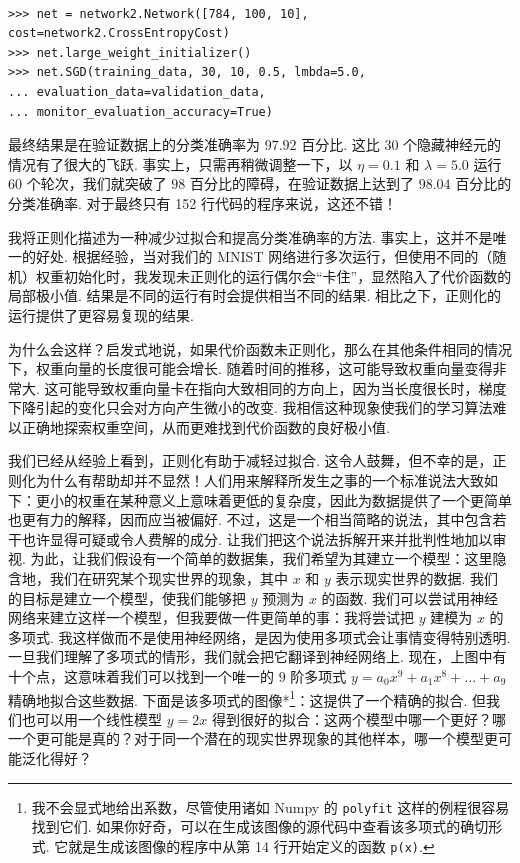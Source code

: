 \begin{lstlisting}

>>> net = network2.Network([784, 100, 10], cost=network2.CrossEntropyCost)
>>> net.large_weight_initializer()
>>> net.SGD(training_data, 30, 10, 0.5, lmbda=5.0,
... evaluation_data=validation_data,
... monitor_evaluation_accuracy=True)

\end{lstlisting}

最终结果是在验证数据上的分类准确率为 $97.92$ 百分比. 这比 30 个隐藏神经元的情况有了很大的飞跃. 事实上，只需再稍微调整一下，以 $\eta = 0.1$ 和 $\lambda = 5.0$ 运行 60 个轮次，我们就突破了 $98$ 百分比的障碍，在验证数据上达到了 $98.04$ 百分比的分类准确率. 对于最终只有 152 行代码的程序来说，这还不错！

我将正则化描述为一种减少过拟合和提高分类准确率的方法. 事实上，这并不是唯一的好处. 根据经验，当对我们的 MNIST 网络进行多次运行，但使用不同的（随机）权重初始化时，我发现未正则化的运行偶尔会``卡住''，显然陷入了代价函数的局部极小值. 结果是不同的运行有时会提供相当不同的结果. 相比之下，正则化的运行提供了更容易复现的结果.

为什么会这样？启发式地说，如果代价函数未正则化，那么在其他条件相同的情况下，权重向量的长度很可能会增长. 随着时间的推移，这可能导致权重向量变得非常大. 这可能导致权重向量卡在指向大致相同的方向上，因为当长度很长时，梯度下降引起的变化只会对方向产生微小的改变. 我相信这种现象使我们的学习算法难以正确地探索权重空间，从而更难找到代价函数的良好极小值.

我们已经从经验上看到，正则化有助于减轻过拟合. 这令人鼓舞，但不幸的是，正则化为什么有帮助却并不显然！人们用来解释所发生之事的一个标准说法大致如下：更小的权重在某种意义上意味着更低的复杂度，因此为数据提供了一个更简单也更有力的解释，因而应当被偏好. 不过，这是一个相当简略的说法，其中包含若干也许显得可疑或令人费解的成分. 让我们把这个说法拆解开来并批判性地加以审视. 为此，让我们假设有一个简单的数据集，我们希望为其建立一个模型：这里隐含地，我们在研究某个现实世界的现象，其中 $x$ 和 $y$ 表示现实世界的数据. 我们的目标是建立一个模型，使我们能够把 $y$ 预测为 $x$ 的函数. 我们可以尝试用神经网络来建立这样一个模型，但我要做一件更简单的事：我将尝试把 $y$ 建模为 $x$ 的多项式. 我这样做而不是使用神经网络，是因为使用多项式会让事情变得特别透明. 一旦我们理解了多项式的情形，我们就会把它翻译到神经网络上. 现在，上图中有十个点，这意味着我们可以找到一个唯一的 $9$ 阶多项式 $y = a_0 x^9 + a_1 x^8 + \ldots + a_9$ 精确地拟合这些数据. 下面是该多项式的图像*\footnote{我不会显式地给出系数，尽管使用诸如 Numpy 的 \texttt{polyfit} 这样的例程很容易找到它们. 如果你好奇，可以在生成该图像的源代码中查看该多项式的确切形式. 它就是生成该图像的程序中从第 14 行开始定义的函数 \texttt{p(x)}.}：这提供了一个精确的拟合. 但我们也可以用一个线性模型 $y = 2x$ 得到很好的拟合：这两个模型中哪一个更好？哪一个更可能是真的？对于同一个潜在的现实世界现象的其他样本，哪一个模型更可能泛化得好？

